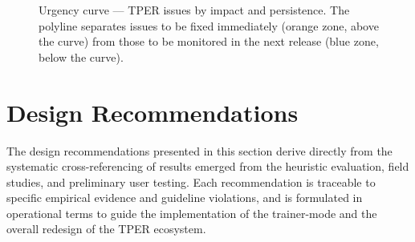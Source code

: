 ﻿\documentclass[11pt,a4paper]{article}
\begin{document}
\begin{figure}[H]
\caption{Urgency curve --- TPER issues by impact and persistence.
  The polyline separates issues to be fixed immediately (orange zone,
  above the curve) from those to be monitored in the next release
  (blue zone, below the curve).}
\label{fig:urgency-curve}
\end{figure}

\newpage

\section{Design Recommendations}

\label{sec:design-recommendations}

The design recommendations presented in this section derive
directly from the systematic cross-referencing of results emerged from the heuristic
evaluation, field studies, and preliminary user testing. Each
recommendation is traceable to specific empirical evidence and guideline
violations, and is formulated in operational terms to guide
the implementation of the trainer-mode and the overall redesign
of the TPER ecosystem.
\end{document}
